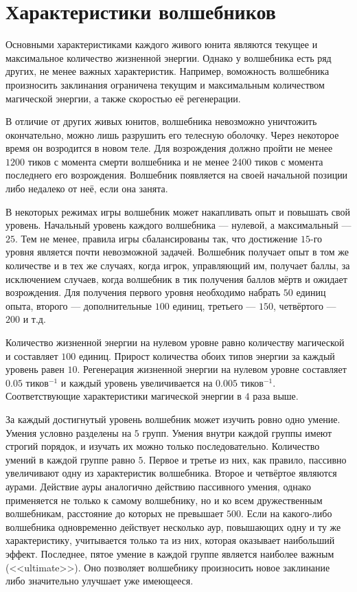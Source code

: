 \section{Характеристики волшебников}

Основными характеристиками каждого живого юнита являются текущее и максимальное количество жизненной энергии. Однако у волшебника есть ряд
других, не менее важных характеристик. Например, воможность волшебника произносить заклинания ограничена текущим и максимальным количеством
магической энергии, а также скоростью её регенерации.

В отличие от других живых юнитов, волшебника невозможно уничтожить окончательно, можно лишь разрушить его телесную оболочку. Через некоторое
время он возродится в новом теле. Для возрождения должно пройти не менее $1200$ тиков с момента смерти волшебника и не менее $2400$ тиков с
момента последнего его возрождения. Волшебник появляется на своей начальной позиции либо недалеко от неё, если она занята.

В некоторых режимах игры волшебник может накапливать опыт и повышать свой уровень. Начальный уровень каждого волшебника --- нулевой, а
максимальный --- $25$. Тем не менее, правила игры сбалансированы так, что достижение $15$-го уровня является почти невозможной задачей.
Волшебник получает опыт в том же количестве и в тех же случаях, когда игрок, управляющий им, получает баллы, за исключением случаев, когда
волшебник в тик получения баллов мёртв и ожидает возрождения. Для получения первого уровня необходимо набрать $50$ единиц опыта, второго ---
дополнительные $100$ единиц, третьего --- $150$, четвёртого --- $200$ и т.д.

Количество жизненной энергии на нулевом уровне равно количеству магической и составляет $100$ единиц. Прирост количества обоих типов энергии
за каждый уровень равен $10$. Регенерация жизненной энергии на нулевом уровне составляет $0.05$ тиков$^{-1}$ и каждый уровень увеличивается
на $0.005$ тиков$^{-1}$. Соответствующие характеристики магической энергии в $4$ раза выше.

За каждый достигнутый уровень волшебник может изучить ровно одно умение. Умения условно разделены на $5$ групп. Умения внутри каждой группы
имеют строгий порядок, и изучать их можно только последовательно. Количество умений в каждой группе равно $5$. Первое и третье из них, как
правило, пассивно увеличивают одну из характеристик волшебника. Второе и четвёртое являются аурами. Действие ауры аналогично действию
пассивного умения, однако применяется не только к самому волшебнику, но и ко всем дружественным волшебникам, расстояние до которых не
превышает $500$. Если на какого-либо волшебника одновременно действует несколько аур, повышающих одну и ту же характеристику, учитывается
только та из них, которая оказывает наибольший эффект. Последнее, пятое умение в каждой группе является наиболее важным (<<ultimate>>). Оно
позволяет волшебнику произносить новое заклинание либо значительно улучшает уже имеющееся.

